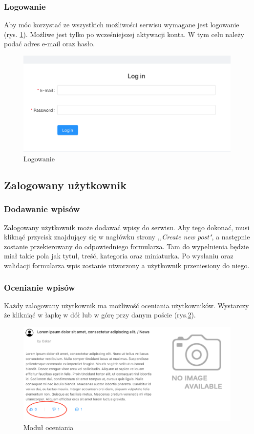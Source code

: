 \documentclass[declaration,shortabstract]{iithesis}
\begin{document}
\subsubsection{Logowanie}
Aby móc korzystać ze wszystkich możliwości serwisu wymagane jest logowanie (rys. \ref{fig:login}). Możliwe jest tylko po wcześniejszej aktywacji konta. W tym celu należy podać adres e-mail oraz hasło.

\begin{figure}
    \centering
    \includegraphics[width=\linewidth]{images/logowanie.png}
    \caption{Logowanie}
    \label{fig:login}
\end{figure}

\subsection{Zalogowany użytkownik}

\subsubsection{Dodawanie wpisów}
Zalogowany użytkownik może dodawać wpisy do serwisu. Aby tego dokonać, musi kliknąć przycisk znajdujący się w nagłówku strony \textit{,,Create new post"}, a następnie zostanie przekierowany do odpowiedniego formularza. Tam do wypełnienia będzie miał takie pola jak tytuł, treść, kategoria oraz miniaturka. Po wysłaniu oraz walidacji formularza wpis zostanie utworzony a użytkownik przeniesiony do niego.

\subsubsection{Ocenianie wpisów}
Każdy zalogowany użytkownik ma możliwość oceniania użytkowników. Wystarczy że klikniąć w łapkę w dół lub w górę przy danym poście (rys.\ref{fig:like}). 
\begin{figure}
    \centering
    \includegraphics[width=\linewidth]{images/like.png}
    \caption{Moduł oceniania}
    \label{fig:like}
\end{figure}
\end{document}
